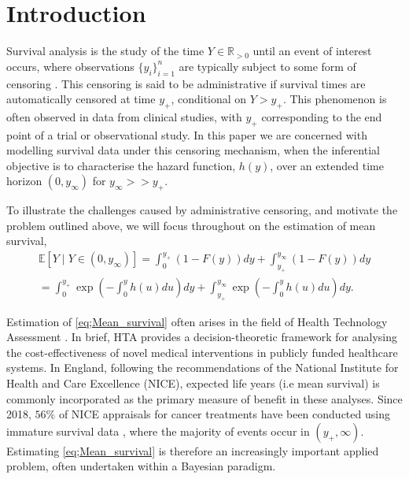 \documentclass[ba,preprint]{imsart}
\theoremstyle{plain}
\theoremstyle{definition}
\theoremstyle{remark}
\begin{document}
\begin{frontmatter}
\begin{keyword}[class=MSC]
\end{keyword}

\begin{keyword}
\end{keyword}

\end{frontmatter}


\section{Introduction}

Survival analysis is the study of the time $Y \in \mathbb{R}_{>0}$ until an event of interest occurs, where observations $\{y_i\}_{i=1}^n$ are typically subject to some form of censoring \citep{Ibrahim2001}. This censoring is said to be administrative if survival times are automatically censored at time $y_+$, conditional on $Y > y_+$. This phenomenon is often observed in data from clinical studies, with $y_+$ corresponding to the end point of a trial or observational study. In this paper we are concerned with modelling survival data under this censoring mechanism, when the inferential objective is to characterise the hazard function, $h(y)$, over an extended time horizon $(0,y_\infty)$ for $y_\infty >> y_+$. 

To illustrate the challenges caused by administrative censoring, and motivate the problem outlined above, we will focus throughout on the estimation of mean survival,
{\color{red}\begin{gather}
    \nonumber
    \mathbb{E}[Y\mid Y \in (0,y_\infty)] = \int_0^{y_+}(1-F(y))dy + \int_{y_+}^{y_\infty}(1-F(y))dy\\
    \label{eq;Mean_survival}
    =\int_0^{y_+}\exp\left(-\int_0^yh(u)du\right)dy +  \int_{y_+}^{y_\infty}\exp\left(-\int_0^yh(u)du\right)dy.
\end{gather}}

Estimation of \eqref{eq;Mean_survival} often arises in the field of Health Technology Assessment \citep[HTA; ][]{Baio2020,Latimer2011}. In brief, HTA provides a decision-theoretic framework for analysing the cost-effectiveness of novel medical interventions in publicly funded healthcare systems. In England, following the recommendations of the National Institute for Health and Care Excellence (NICE), expected life years (i.e mean survival) is commonly incorporated as the primary measure of benefit in these analyses. Since 2018, $56\%$ of NICE appraisals for cancer treatments have been conducted using immature survival data \citep{Gibbons2024}, where the majority of events occur in $(y_+,\infty)$. Estimating \eqref{eq;Mean_survival} is therefore an increasingly important applied problem, often undertaken within a Bayesian paradigm.
\end{document}
